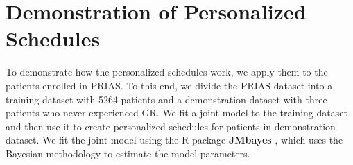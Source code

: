 
\section{Demonstration of Personalized Schedules}
\label{sec : pers_schedule_PRIAS}
To demonstrate how the personalized schedules work, we apply them to the patients enrolled in PRIAS. To this end, we divide the PRIAS dataset into a training dataset with 5264 patients and a demonstration dataset with three patients who never experienced GR. We fit a joint model to the training dataset and then use it to create personalized schedules for patients in demonstration dataset. We fit the joint model using the R package \textbf{JMbayes} \citep{rizopoulosJMbayes}, which uses the Bayesian methodology to estimate the model parameters.

